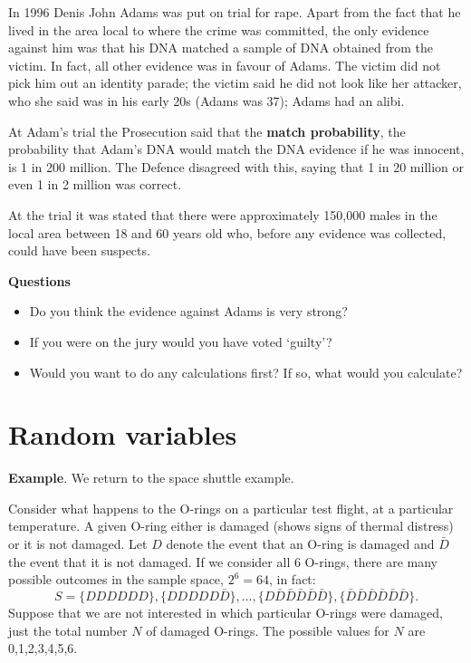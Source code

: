 \documentclass[
  british,
  11pt,
  openany, a4paper]{book}
\providecommand{\tightlist}{%
  \setlength{\itemsep}{0pt}\setlength{\parskip}{0pt}}
\begin{document}
In 1996 Denis John Adams was put on trial for rape. Apart from the fact that he lived in the area local to where the crime was committed, the only evidence against him was that his DNA matched a sample of DNA obtained from the victim.
In fact, all other evidence was in favour of Adams. The victim did not pick him out an identity parade; the victim said he did not look like her attacker, who she said was in his early 20s (Adams was 37); Adams had an alibi.

At Adam's trial the Prosecution said that the \textbf{match probability}, the probability that Adam's DNA would match the DNA evidence if he was innocent, is 1 in 200 million. The Defence disagreed with this, saying that 1 in 20 million or even 1 in 2 million was correct.

At the trial it was stated that there were approximately 150,000 males in the local area between 18 and 60 years old who, before any evidence was collected, could have been suspects.

\textbf{Questions}

\begin{itemize}
\tightlist
\item
  Do you think the evidence against Adams is very strong?
\item
  If you were on the jury would you have voted `guilty'?
\item
  Would you want to do any calculations first? If so, what would you calculate?
\end{itemize}

\chapter{Random variables}\label{rvs}

\textbf{Example}. We return to the space shuttle example.

Consider what happens to the O-rings on a particular test flight, at a particular temperature. A given O-ring either is damaged (shows signs of thermal distress) or it is not damaged. Let \(D\) denote the event that an O-ring is damaged and \(\bar{D}\) the event that it is not damaged. If we consider all 6 O-rings, there are many possible outcomes in the sample space, \(2^6=64\), in fact:
\[ S= \{DDDDDD\}, \{DDDDD\bar{D}\}, \ldots, \{D\bar{D}\bar{D}\bar{D}\bar{D}\bar{D}\}, 
\{\bar{D}\bar{D}\bar{D}\bar{D}\bar{D}\bar{D}\}. \]
Suppose that we are not interested in which particular O-rings were damaged, just the total number \(N\) of damaged O-rings. The possible values for \(N\) are 0,1,2,3,4,5,6.
\end{document}
